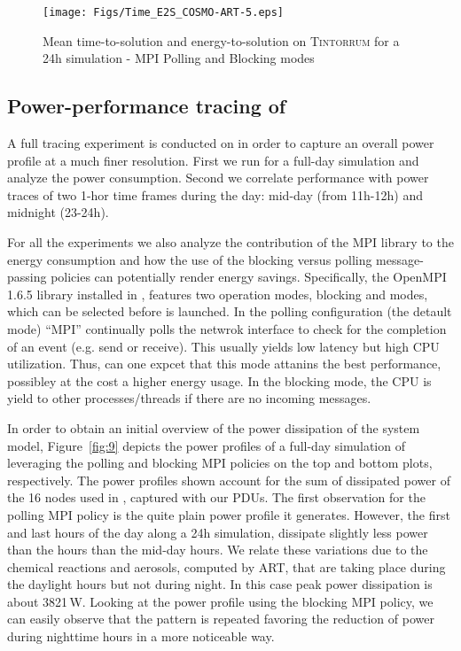 \begin{figure}[htbf]
  \texttt{[image: Figs/Time\_E2S\_COSMO-ART-5.eps]}
  \caption{Mean time-to-solution and energy-to-solution on
    \textsc{Tintorrum} for a 24h simulation - MPI Polling and Blocking
    modes}
  \label{fig:4}
\end{figure}

\subsection{Power-performance tracing of \cosmoart}
\label{subsec:4.3}

A full tracing experiment is conducted on \tinto in order to capture an overall power
profile at a much finer resolution. First we run \cosmoart for a full-day simulation
and analyze the power consumption. Second we correlate performance with
power traces of two 1-hor time frames during the day: mid-day (from 11h-12h) and
midnight (23-24h).

For all the experiments we also analyze the contribution of the MPI library to the energy consumption and how the use of the blocking versus polling message-passing policies can potentially render energy savings. Specifically, the OpenMPI 1.6.5 library installed in \tinto, features two operation modes, blocking and modes, which can be selected before \cosmoart is launched. In the polling configuration (the detault mode) ``MPI'' continually polls
the netwrok interface to check for the completion of an event (e.g. send or receive).
This usually yields low latency but high CPU utilization. Thus, can one expcet that this mode attanins the best performance, possibley at the cost a higher energy usage. In the blocking
mode, the CPU is yield to other processes/threads if there are no incoming messages.

In order to obtain an initial overview of the power dissipation of the system model, Figure~\ref{fig:9} depicts the power profiles of a full-day simulation of \cosmoart leveraging the  polling and blocking MPI policies on the top and bottom plots, respectively. The power profiles shown account for the sum of dissipated power of the 16 nodes used in \tinto, captured with our PDUs. The first observation for the polling MPI policy is the quite plain power profile it generates. However, the first and last hours of the day along a 24h simulation, dissipate slightly less power than the hours than the mid-day hours. We relate these variations due to the chemical reactions and aerosols, computed by ART, that are taking place during the daylight hours but not during night. In this case peak power dissipation is about 3821\,W.
Looking at the power profile using the blocking MPI policy, we can easily observe
that the pattern is repeated favoring the reduction of power during nighttime hours in a more noticeable way. 


